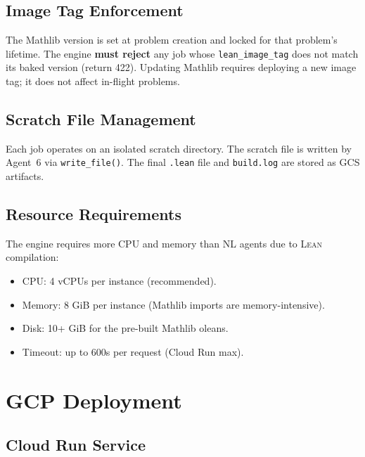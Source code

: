 \documentclass[11pt,a4paper]{article}
\newcommand{\Lean}{\textsc{Lean}}
\begin{document}
\subsection{Image Tag Enforcement}

The Mathlib version is set at problem creation and locked for that problem's lifetime. The engine \textbf{must reject} any job whose \texttt{lean\_image\_tag} does not match its baked version (return 422). Updating Mathlib requires deploying a new image tag; it does not affect in-flight problems.

\subsection{Scratch File Management}

Each job operates on an isolated scratch directory. The scratch file is written by Agent~6 via \texttt{write\_file()}. The final \texttt{.lean} file and \texttt{build.log} are stored as GCS artifacts.

\subsection{Resource Requirements}

The engine requires more CPU and memory than NL agents due to \Lean{} compilation:

\begin{itemize}[leftmargin=2em]
  \item CPU: 4 vCPUs per instance (recommended).
  \item Memory: 8 GiB per instance (Mathlib imports are memory-intensive).
  \item Disk: 10+ GiB for the pre-built Mathlib oleans.
  \item Timeout: up to 600s per request (Cloud Run max).
\end{itemize}

\section{GCP Deployment}

\subsection{Cloud Run Service}
\end{document}
